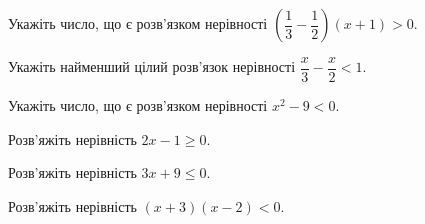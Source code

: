 \documentclass[12pt]{article}
\begin{document}
\begin{samepage}
\noindent\zadnum Укажіть число, що є розв'язком нерівності $\left(\dfrac{1}{3} - \dfrac{1}{2}\right)(x + 1) > 0$. 

\nmtnobreak
{}
\par{}
\end{samepage}

\begin{samepage}
\noindent\zadnum Укажіть найменший цілий розв'язок нерівності $\dfrac{x}{3} - \dfrac{x}{2} < 1$. 

\nmtnobreak
{}
\par{}
\end{samepage}

\begin{samepage}
\noindent\zadnum Укажіть число, що є розв'язком нерівності $x^2 - 9 < 0$. 

\nmtnobreak
{}
\par{}
\end{samepage}

\begin{samepage}
\noindent\zadnum Розв'яжіть нерівність $2x - 1 \geqslant 0$. 

\nmtnobreak
\answerTable{$(0{,}5; +\infty)$}{$[-2; +\infty)$}{$[-0{,}5; +\infty)$}{$[0{,}5; +\infty)$}{$[2; +\infty)$}
\par{}
\end{samepage}

\begin{samepage}
\noindent\zadnum Розв'яжіть нерівність $3x + 9 \leqslant 0$. 

\nmtnobreak
\answerTable{$[-3; +\infty)$}{$[3; +\infty)$}{$(-\infty; 6]$}{$(-\infty; -3]$}{$(-\infty; 3]$}
\par{}
\end{samepage}

\begin{samepage}
\noindent\zadnum Розв'яжіть нерівність $(x + 3)(x - 2) < 0$. 
\par{}\vspace{0.25cm}
\end{samepage}
\end{document}
